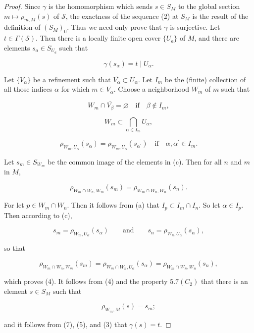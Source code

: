 \begin{proof}
Since $\gamma$ is the homomorphism which sends $s\in S_M$ to the global section $m \mapsto \rho_{m,M}(s)$ of $\mathcal{S}$, the exactness of the sequence (2) at $S_M$ is the result of the definition of $(S_M)_0$. Thus we need only prove that $\gamma$ is surjective. Let $t \in \Gamma(\mathcal{S})$. Then there is a locally finite open cover $\{U_a\}$ of $M$, and there are elements $s_a \in S_{U_a}$ such that

\begin{equation}
\tag{3}\label{eq:5.27:3}
\gamma(s_{\alpha})=t\mid U_{\alpha}.
\end{equation}

Let $\{V_{\alpha}\}$ be a refinement such that $\overline{V_{\alpha}} \subset U_{\alpha}$. Let $I_{m}$ be the (finite) collection of all those indices $\alpha$ for which $m \in \overline{V_{\alpha}}$. Choose a neighborhood $W_{m}$ of $m$ such that

\[
W_{m}\cap\overline{{V_{\beta}}}=\varnothing\quad\mathrm{if}\quad\beta\notin I_{m},
\]

\[
W_{m}\subset\bigcap_{\alpha\in I_{m}}U_{\alpha},
\]

\[
\rho_{W_{m},U_{\alpha}}(s_{\alpha})=\rho_{W_{m},U_{\alpha}}(s_{\alpha^{\prime}})\quad\mathrm{if}\quad\alpha,\alpha^{\prime}\in I_{m}.
\]

Let $s_{m} \in S_{W_{m}}$ be the common image of the elements in (c). Then for all $n$ and $m$ in $M$,

\begin{equation}
\tag{4}\label{eq:5.27:4}
\rho_{W_{m}\cap W_{n},W_{m}}(s_{m})=\rho_{W_{m}\cap W_{n},W_{n}}(s_{n}).
\end{equation}

For let $p \in W_m \cap W_n$. Then it follows from (a) that $I_p \subset I_m \cap I_n$. So let $\alpha \in I_p$. Then according to (c),

\begin{equation}
\tag{5}\label{eq:5.27:5}
s_{m}=\rho_{W_{m},U_{\alpha}}(s_{\alpha})\qquad\mathrm{and}\qquad s_{n}=\rho_{W_{n},U_{\alpha}}(s_{\alpha}),
\end{equation}

so that

\begin{equation}
\tag{6}\label{eq:5.27:6}
\rho_{W_{m}\cap W_{n},W_{m}}(s_{m})=\rho_{W_{m}\cap W_{n},U_{\alpha}}(s_{\alpha})=\rho_{W_{m}\cap W_{n},W_{n}}(s_{n}),
\end{equation}

which proves (4). It follows from (4) and the property $5.7(C_{2})$ that there is an element $s \in S_{M}$ such that

\begin{equation}
\tag{7}\label{eq:5.27:7}
\rho_{W_{m},M}(s)=s_{m};
\end{equation}

and it follows from (7), (5), and (3) that  $ \gamma(s) = t $.

\end{proof}

